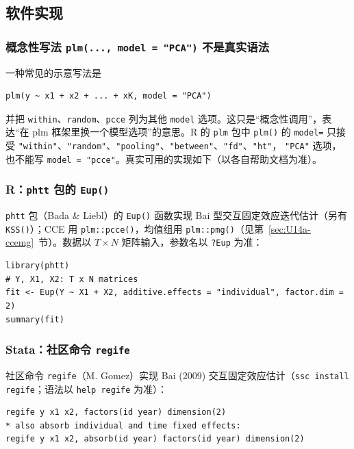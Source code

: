 \subsection{软件实现}

\subsubsection{概念性写法 \texttt{plm(..., model = "PCA")} 不是真实语法}

一种常见的示意写法是
\begin{lstlisting}
plm(y ~ x1 + x2 + ... + xK, model = "PCA")
\end{lstlisting}
并把 \texttt{within}、\texttt{random}、\texttt{pcce} 列为其他 \texttt{model} 选项。这只是“概念性调用”，表达“在 plm 框架里换一个模型选项”的意思。R 的 \texttt{plm} 包中 \texttt{plm()} 的 \texttt{model=} 只接受 \texttt{"within"}、\texttt{"random"}、\texttt{"pooling"}、\texttt{"between"}、\texttt{"fd"}、\texttt{"ht"}， \texttt{"PCA"} 选项，也不能写 \texttt{model = "pcce"}。真实可用的实现如下（以各自帮助文档为准）。

\subsubsection{R：\texttt{phtt} 包的 \texttt{Eup()}}

\texttt{phtt} 包（Bada \& Liebl）的 \texttt{Eup()} 函数实现 Bai 型交互固定效应迭代估计（另有 \texttt{KSS()}）；CCE 用 \texttt{plm::pcce()}，均值组用 \texttt{plm::pmg()}（见第~\ref{sec:U14a-ccemg}~节）。数据以 $T\times N$ 矩阵输入，参数名以 \texttt{?Eup} 为准：
\begin{lstlisting}
library(phtt)
# Y, X1, X2: T x N matrices
fit <- Eup(Y ~ X1 + X2, additive.effects = "individual", factor.dim = 2)
summary(fit)
\end{lstlisting}

\subsubsection{Stata：社区命令 \texttt{regife}}

社区命令 \texttt{regife}（M. Gomez）实现 Bai (2009) 交互固定效应估计（\texttt{ssc install regife}；语法以 \texttt{help regife} 为准）：
\begin{lstlisting}
regife y x1 x2, factors(id year) dimension(2)
* also absorb individual and time fixed effects:
regife y x1 x2, absorb(id year) factors(id year) dimension(2)
\end{lstlisting}

